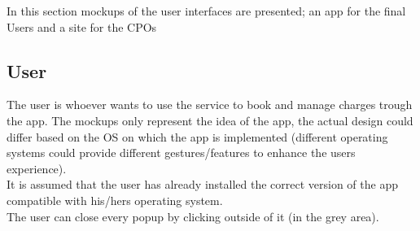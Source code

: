 In this section mockups of the user interfaces are presented; an app for the final Users and a site for the \acp{CPO}\\
\subsection{User}
The user is whoever wants to use the service to book and manage charges trough the app. The mockups only represent the idea of the app, the actual design could differ based on the OS on which the app is implemented (different operating systems could provide different gestures/features to enhance the users experience).\\
It is assumed that the user has already installed the correct version of the app compatible with his/hers operating system.\\
The user can close every popup by clicking outside of it (in the grey area).
